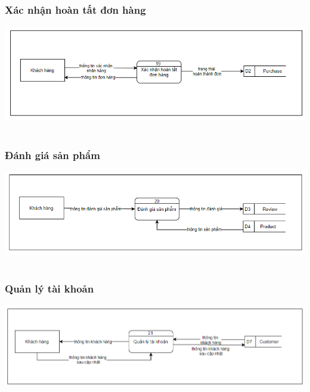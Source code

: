 \documentclass[12pt,a4paper,2sides]{report}
\begin{document}
\subsubsection{Xác nhận hoàn tất đơn hàng}
    \includegraphics[width=1\linewidth]{lib/DFD/xacnhanhoantatdh.png}\\\vspace*{1cm}  
    \hspace{4cm}{Hình 15. Xác nhận hoàn tất đơn hàng}\\
\subsubsection{Đánh giá sản phẩm}
    \includegraphics[width=1\linewidth]{lib/DFD/danhgiasp.png}\\\vspace*{1cm}  
    \hspace{5cm}{Hình 16. Đánh giá sản phẩm}\\
\subsubsection{Quản lý tài khoản}
    \includegraphics[width=1\linewidth]{lib/DFD/quanlytk.png}\\\vspace*{1cm}
    \hspace{5cm}{Hình 17. Quản lý tài khoản}\\
\end{document}
